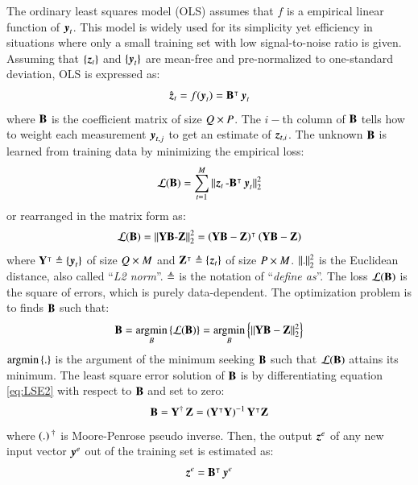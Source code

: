 The ordinary least squares model (OLS) assumes that $ f $ is a empirical linear function of $ \operatorname{\boldsymbol{y}}_t $. This model is widely used for its simplicity yet efficiency in situations where only a small training set with low signal-to-noise ratio is given. Assuming that $ \{\operatorname{\boldsymbol{z}}_t\} $ and $ \{\operatorname{\boldsymbol{y}}_t\} $ are mean-free and pre-normalized to one-standard deviation, OLS is expressed as:
\begin{equation}
\operatorname{\hat{\operatorname{\boldsymbol{z}} }}_t = f(\operatorname{\boldsymbol{y}}_t) = \mathbf{B}^{\intercal}\operatorname{\boldsymbol{y}}_t
\end{equation}
where  $ \mathbf{B} $ is the coefficient matrix of size $ Q \times P $. The $ i- $th column of $ \mathbf{B} $ tells how to weight each measurement  $ \operatorname{\boldsymbol{y}}_{t,j} $ to get an estimate of $ \operatorname{\boldsymbol{z}}_{t,i} $. The unknown $ \mathbf{B} $ is learned from training data by minimizing the empirical loss:
\begin{equation}
\mathcal{L}(\mathbf{B}) = \sum^{M}_{t=1}{ \operatorname{\Arrowvert \mathit{\operatorname{\boldsymbol{z}}_t-\mathbf{B}^{\intercal}\operatorname{\boldsymbol{y}}_t} \Arrowvert^2_2 }	}
\end{equation}
or rearranged in the matrix form as:
\begin{equation}
\mathcal{L}(\mathbf{B}) = \operatorname{\Arrowvert \mathit{\mathbf{Y}\mathbf{B}-\mathbf{Z}} \Arrowvert^2_2 } = \left(\mathbf{Y}\mathbf{B}-\mathbf{Z}\right)^{\intercal}\left(\mathbf{Y}\mathbf{B}-\mathbf{Z}\right)
\label{eq:LSE2}
\end{equation}
where $ \mathbf{Y}^{\intercal} \triangleq \{\operatorname{\boldsymbol{y}}_t\} $ of size $ Q \times M $ and $ \mathbf{Z}^{\intercal} \triangleq \{\operatorname{\boldsymbol{z}}_t \} $ of size $P \times M$. $ \operatorname{\Arrowvert \mathit{.} \Arrowvert^2_2 } $ is the Euclidean distance, also called ``\textit{L2 norm}''. $ \triangleq $ is the notation of ``\textit{define as}''. The loss $ \mathcal{L}(\mathbf{B}) $ is the square of errors, which is purely data-dependent. The optimization problem is to finds $ \mathbf{B} $ such that:
\begin{equation}
\mathbf{B}= \operatorname*{\arg\!\min}_B{ \left\lbrace \mathcal{L}(\mathbf{B}) \right\rbrace} = \operatorname*{\arg\!\min}_B{ \left\lbrace\Vert \mathbf{Y}\mathbf{B}-\mathbf{Z}\Vert^2_2 \right\rbrace}
\end{equation}
$ \operatorname*{\arg\!\min}{ \{ . \}} $ is the argument of the minimum seeking $ \mathbf{B} $ such that $ \mathcal{L}(\mathbf{B}) $ attains its minimum. The least square error solution of $ \mathbf{B} $ is by differentiating equation \ref{eq:LSE2} with respect to $\mathbf{B}$ and set to zero:
\begin{equation}
\mathbf{B}= \operatorname{ \mathit{ \mathbf{Y} } ^\dagger} \mathbf{Z}= \left( \mathbf{Y}^{\intercal}\mathbf{Y} \right)^{-1} \mathbf{Y}^{\intercal}\mathbf{Z}
\label{eq:LSE5}
\end{equation}
where $ (.)\operatorname{ \mathit{} ^\dagger} $ is Moore-Penrose pseudo inverse. Then, the output $ \operatorname{\boldsymbol{z}}^{e}  $ of any new input vector $ \operatorname{\boldsymbol{y}}^{e}$ out of the training set is estimated as:
\begin{equation}
\operatorname{\boldsymbol{z}}^{e} = \mathbf{B}^{\intercal}\operatorname{\boldsymbol{y}}^{e}
\label{eq:LSE6}
\end{equation} 

